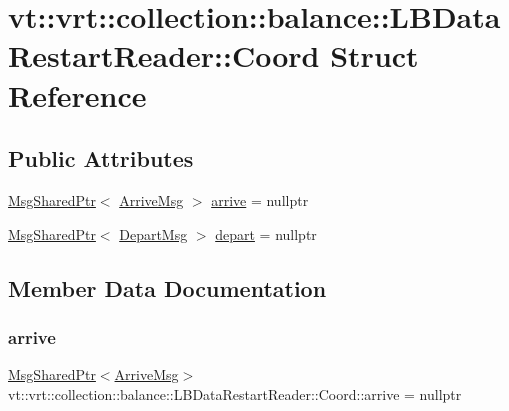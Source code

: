 \hypertarget{structvt_1_1vrt_1_1collection_1_1balance_1_1_l_b_data_restart_reader_1_1_coord}{}\section{vt\+:\+:vrt\+:\+:collection\+:\+:balance\+:\+:L\+B\+Data\+Restart\+Reader\+:\+:Coord Struct Reference}
\label{structvt_1_1vrt_1_1collection_1_1balance_1_1_l_b_data_restart_reader_1_1_coord}
\subsection*{Public Attributes}
\begin{DoxyCompactItemize}
\item 
\hyperlink{namespacevt_ab2b3d506ec8e8d1540aede826d84a239}{Msg\+Shared\+Ptr}$<$ \hyperlink{structvt_1_1vrt_1_1collection_1_1balance_1_1_l_b_data_restart_reader_1_1_arrive_msg}{Arrive\+Msg} $>$ \hyperlink{structvt_1_1vrt_1_1collection_1_1balance_1_1_l_b_data_restart_reader_1_1_coord_a3b0807e8a6c5462bb3b7a47821e93e6c}{arrive} = nullptr
\item 
\hyperlink{namespacevt_ab2b3d506ec8e8d1540aede826d84a239}{Msg\+Shared\+Ptr}$<$ \hyperlink{structvt_1_1vrt_1_1collection_1_1balance_1_1_l_b_data_restart_reader_1_1_depart_msg}{Depart\+Msg} $>$ \hyperlink{structvt_1_1vrt_1_1collection_1_1balance_1_1_l_b_data_restart_reader_1_1_coord_aaaed15af931102018fbb9148e3b75604}{depart} = nullptr
\end{DoxyCompactItemize}


\subsection{Member Data Documentation}
\mbox{\label{structvt_1_1vrt_1_1collection_1_1balance_1_1_l_b_data_restart_reader_1_1_coord_a3b0807e8a6c5462bb3b7a47821e93e6c}} 
\subsubsection{\texorpdfstring{arrive}{arrive}}
{\footnotesize\ttfamily \hyperlink{namespacevt_ab2b3d506ec8e8d1540aede826d84a239}{Msg\+Shared\+Ptr}$<$\hyperlink{structvt_1_1vrt_1_1collection_1_1balance_1_1_l_b_data_restart_reader_1_1_arrive_msg}{Arrive\+Msg}$>$ vt\+::vrt\+::collection\+::balance\+::\+L\+B\+Data\+Restart\+Reader\+::\+Coord\+::arrive = nullptr}

